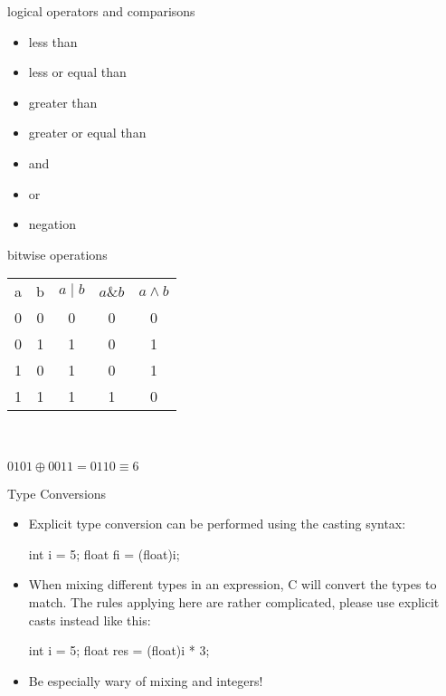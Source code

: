 \documentclass[10pt,graphics,aspectratio=169,table]{beamer}
\begin{document}
\begin{frame}[fragile]{logical operators and comparisons}
    \begin{itemize}
        \item \code{<} less than
        \item \code {<=} less or equal than
        \item \code {>} greater than
        \item \code{>=} greater or equal than 
        \item \code{&&} and
        \item \code{||} or
        \item \code{!} negation
    \end{itemize}
\end{frame}
\begin{frame}[fragile]{bitwise operations}
    \begin{center}
    \begin{tabular}{c|c|c|c|c}
    a & b & $a\mid b$ & $a\&b$ & $a \wedge b$ \\
    0 & 0 & 0   &  0   & 0   \\
    0 & 1 & 1   &  0   & 1   \\
    1 & 0 & 1   &  0   & 1   \\
    1 & 1 & 1   &  1   & 0   \\
    \end{tabular}\\
    \\
    $0101 \oplus 0011 = 0110 \equiv 6$
    \end{center}
\end{frame}

\begin{frame}[fragile]{Type Conversions}
    \begin{itemize}
        \item 
            Explicit type conversion can be performed using the casting syntax:
            \begin{codeblock}
int i = 5;
float fi = (float)i;
            \end{codeblock}
        \item 
            When mixing different types in an expression, C will convert the
            types to match. The rules applying here are rather complicated,
            please use explicit casts instead like this: 
            \begin{codeblock}
int i = 5;
float res = (float)i * 3;
            \end{codeblock}
        \item 
            Be especially wary of mixing 
            and  integers!
    \end{itemize}\ \\
    \ \\

\end{frame}
\end{document}
